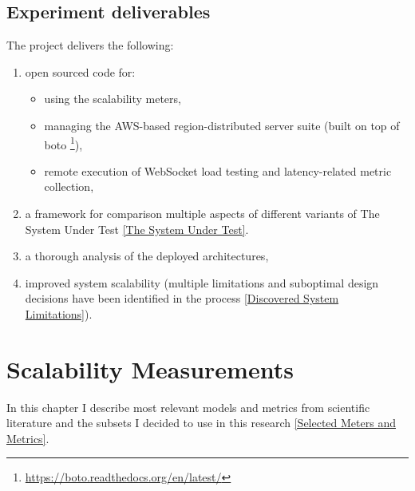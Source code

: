 \documentclass{uvamscse}
\begin{document}
\section{Experiment deliverables}\label{Experiment deliverables}

The project delivers the following:
\begin{enumerate}
  \item open sourced code for:
  \begin{itemize}
    \item using the scalability meters,
    \item managing the AWS-based region-distributed server suite (built on top of boto \footnote{\url{https://boto.readthedocs.org/en/latest/}}),
    \item remote execution of WebSocket load testing and latency-related metric collection,
  \end{itemize}
  \item a framework for comparison multiple aspects of different variants of The System Under Test \ref{The System Under Test}.
  \item a thorough analysis of the deployed architectures,
  \item improved system scalability (multiple limitations and suboptimal design decisions have been identified in the process \ref{Discovered System Limitations}).
\end{enumerate}


\chapter{Scalability Measurements} \label{Scalability Measurements}
In this chapter I describe most relevant models and metrics from scientific literature and the subsets I decided to use in this research \ref{Selected Meters and Metrics}.
\end{document}
